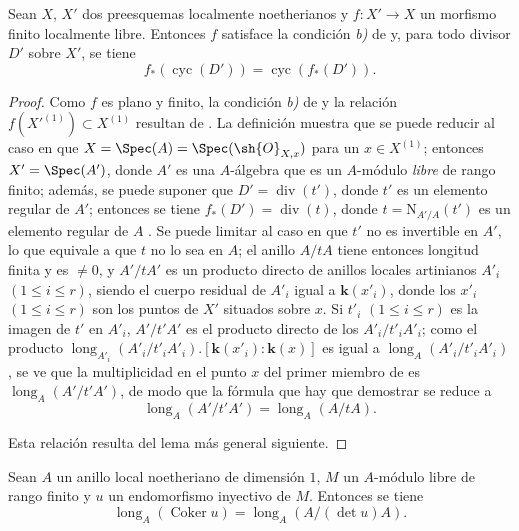 \begin{proposition}[21.10.17]
\label{IV.21.10.17}
Sean $X$, $X'$ dos preesquemas localmente noetherianos y $f:X'\to X$ un morfismo finito localmente libre.
Entonces $f$ satisface la condición \emph{b)} de  y, para todo divisor $D'$ sobre $X'$, se tiene
\[
\label{IV.21.10.17.1}
  f_*(\operatorname{cyc}(D'))=\operatorname{cyc}(f_*(D')).
  \tag{21.10.17.1}
\]
\end{proposition}

\begin{proof}
Como $f$ es plano y finito, la condición \emph{b)} de  y la relación $f(X'^{(1)})\subset X^{(1)}$ resultan de .
La definición  muestra que se puede reducir al caso en que $X=\Spec(A)=\Spec(\sh{O}_{X,x})$ para un $x\in X^{(1)}$;
entonces $X'=\Spec(A')$, donde $A'$ es una
$A$-álgebra que es un $A$-módulo \emph{libre} de rango finito;
además, se puede suponer que $D'=\operatorname{div}(t')$, donde $t'$ es un elemento regular de $A'$;
entonces se tiene $f_*(D')=\operatorname{div}(t)$, donde $t=\mathrm{N}_{A'/A}(t')$ es un elemento regular de $A$ .
Se puede limitar al caso en que $t'$ no es invertible en $A'$, lo que equivale a que $t$ no lo sea en $A$;
el anillo $A/tA$ tiene entonces longitud finita y es $\neq0$, y $A'/tA'$ es un producto directo de anillos locales artinianos $A'_i$ $(1\leq i\leq r)$, siendo el cuerpo residual de $A'_i$ igual a $\boldsymbol{k}(x'_i)$, donde los $x'_i$ $(1\leq i\leq r)$ son los puntos de $X'$ situados sobre $x$.
Si $t'_i$ $(1\leq i\leq r)$ es la imagen de $t'$ en $A'_i$, $A'/t'A'$ es el producto directo de los $A'_i/t'_iA'_i$;
como el producto $\operatorname{long}_{A'_i}(A'_i/t'_iA'_i).[\boldsymbol{k}(x'_i):\boldsymbol{k}(x)]$ es igual a $\operatorname{long}_A(A'_i/t'_iA'_i)$, se ve que la multiplicidad en el punto $x$ del primer miembro de  es $\operatorname{long}_A(A'/t'A')$, de modo que la fórmula que hay que demostrar se reduce a
\[
\label{IV.21.10.17.2}
  \operatorname{long}_A(A'/t'A')=\operatorname{long}_A(A/tA).
  \tag{21.10.17.2}
\]

Esta relación resulta del lema más general siguiente.
\end{proof}

\begin{lemma}[21.10.17.3]
\label{IV.21.10.17.3}
Sean $A$ un anillo local noetheriano de dimensión $1$, $M$ un $A$-módulo libre de rango finito y $u$ un endomorfismo inyectivo de $M$.
Entonces se tiene
\[
\label{IV.21.10.17.4}
  \operatorname{long}_A(\operatorname{Coker}u)=\operatorname{long}_A(A/(\det u)A).
  \tag{21.10.17.4}
\]
\end{lemma}


